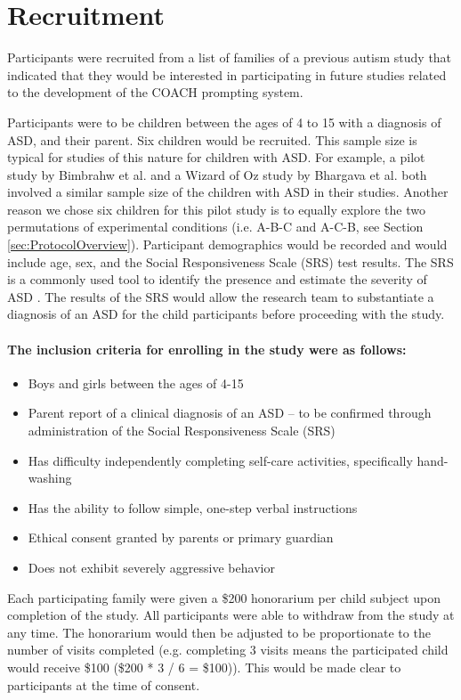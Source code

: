 \section{Recruitment}

Participants were recruited from a list of families of a previous autism study that indicated that they would be interested in participating in future studies related to the development of the COACH prompting system.

Participants were to be children between the ages of 4 to 15 with a diagnosis of ASD, and their parent. Six children would be recruited. This sample size is typical for studies of this nature for children with ASD. For example, a pilot study by Bimbrahw et al. \cite{bimbrahw2012investigating} and a Wizard of Oz study by Bhargava et al. \cite{bhargava2013demonstration} both involved a similar sample size of the children with ASD in their studies. Another reason we chose six children for this pilot study is to equally explore the two permutations of experimental conditions (i.e. A-B-C and A-C-B, see Section \ref{sec:ProtocolOverview}). Participant demographics would be recorded and would include age, sex, and the Social Responsiveness Scale (SRS) test results.  The SRS is a commonly used tool to identify the presence and estimate the severity of ASD \cite{constantino2002social}. The results of the SRS would allow the research team to substantiate a diagnosis of an ASD for the child participants before proceeding with the study.

\paragraph{The \textbf{inclusion criteria} for enrolling in the study were as follows:}
\begin{itemize}
	\item Boys and girls between the ages of 4-15
	\item Parent report of a clinical diagnosis of an ASD – to be confirmed through administration of the Social Responsiveness Scale (SRS)
	\item Has difficulty independently completing self-care activities, specifically hand-washing
	\item Has the ability to follow simple, one-step verbal instructions
	\item Ethical consent  granted by parents or primary guardian
	\item Does not exhibit severely aggressive behavior
\end{itemize}

Each participating family were given a \$200 honorarium per child subject upon completion of the study. All participants were able to withdraw from the study at any time. The honorarium would then be adjusted to be proportionate to the number of visits completed (e.g. completing 3 visits means the participated child would receive \$100 (\$200 * 3 / 6 = \$100)). This would be made clear to participants at the time of consent.
